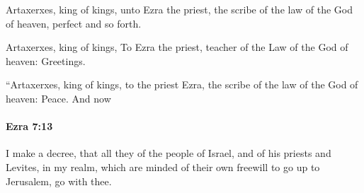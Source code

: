 			\begin{versebox}
					\item[BHS] 
					\item[LXX] 
					\item[ASV] Artaxerxes, king of kings, unto Ezra the priest, the scribe of the law of the God of heaven, perfect and so forth.
					\item[NIV] Artaxerxes, king of kings, To Ezra the priest, teacher of the Law of the God of heaven: Greetings.
					\item[NRSV] “Artaxerxes, king of kings, to the priest Ezra, the scribe of the law of the God of heaven: Peace. And now
			\end{versebox}

		\paragraph{Ezra 7:13} %
			\label{EZRA-7-13}

			I make a decree, that all they of the people of Israel, and of his priests and Levites, in my realm, which are minded of their own freewill to go up to Jerusalem, go with thee.

